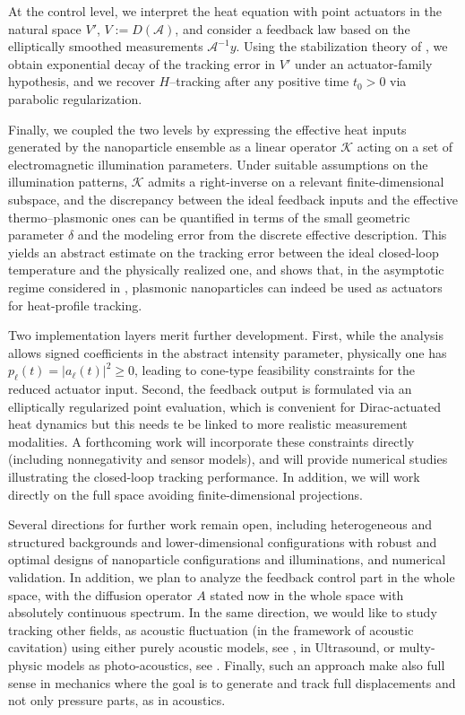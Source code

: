\documentclass[11pt,a4paper]{article}
\numberwithin{equation}{section}
\theoremstyle{definition}
\newcommand{\1}{\mathbbm{1}}
\begin{document}
\noindent At the control level, we interpret the heat equation with point actuators in the natural
space $V'$, $V:=D(\mathcal A)$, and consider a feedback law based on the
elliptically smoothed measurements $\mathcal A^{-1}y$.
Using the stabilization theory of \cite{KunRodWal24-cocv}, we obtain exponential decay of the
tracking error in $V'$ under an actuator-family hypothesis, and we recover $H$--tracking after any
positive time $t_0>0$ via parabolic regularization.

\noindent Finally, we coupled the two levels by expressing the effective heat inputs
generated by the nanoparticle ensemble as a linear operator $\mathcal{K}$
acting on a set of electromagnetic illumination parameters. Under suitable
assumptions on the illumination patterns, $\mathcal{K}$ admits a right-inverse
on a relevant finite-dimensional subspace, and the discrepancy between the
ideal feedback inputs and the effective thermo--plasmonic ones can be
quantified in terms of the small geometric parameter $\delta$ and the modeling
error from the discrete effective description. This yields an abstract estimate
on the tracking error between the ideal closed-loop temperature and the
physically realized one, and shows that, in the asymptotic regime considered
in \cite{CaoMukherjeeSini2025}, plasmonic nanoparticles can indeed be used as
actuators for heat-profile tracking.
\bigskip

\noindent Two implementation layers merit further development.
First, while the analysis allows signed coefficients in the abstract intensity parameter, physically one has
$p_\ell(t)=|a_\ell(t)|^2\ge 0$, leading to cone-type feasibility constraints for the reduced actuator input.
Second, the feedback output is formulated via an elliptically regularized point evaluation, which is convenient
for Dirac-actuated heat dynamics but this needs te be linked to more realistic
measurement modalities.
A forthcoming work will incorporate these constraints directly (including nonnegativity and sensor models), and
will provide numerical studies illustrating the closed-loop tracking performance. In addition, we will work directly on the full space avoiding finite-dimensional projections.
\bigskip

\noindent Several directions for further work remain open, including heterogeneous and
structured backgrounds and lower-dimensional configurations with
 robust and optimal designs of nanoparticle configurations
and illuminations, and numerical validation. In addition, we plan to analyze the feedback control part in the whole space, with the diffusion operator $A$ stated now in the whole space with absolutely continuous spectrum. In the same direction, we would like to study tracking other fields, as acoustic fluctuation (in the framework of acoustic cavitation) using either purely acoustic models, see \cite{Mukherjee2024}, in Ultrasound, or multy-physic models as photo-acoustics, see \cite{Ghandriche2022}. Finally, such an approach make also full sense in mechanics where the goal is to generate and track full displacements and not only pressure parts, as in acoustics.    
\bigskip
\end{document}
